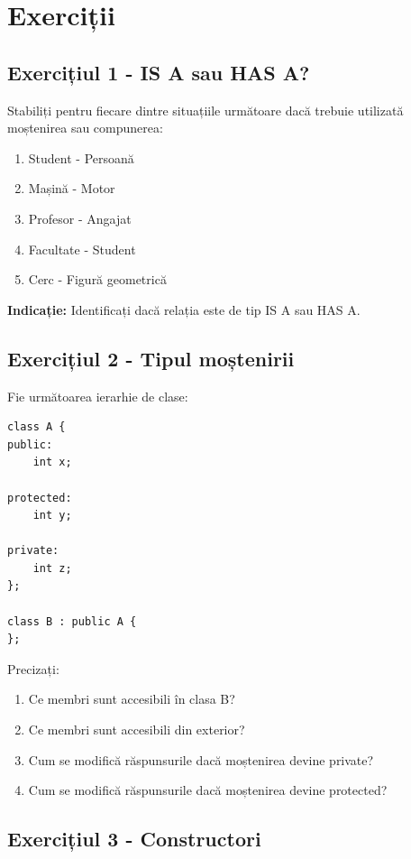 \documentclass[12pt,a4paper]{article}
\begin{document}
\section{Exerciții}

\subsection{Exercițiul 1 - IS A sau HAS A?}

Stabiliți pentru fiecare dintre situațiile următoare dacă trebuie utilizată moștenirea sau compunerea:

\begin{enumerate}
\item Student - Persoană
\item Mașină - Motor
\item Profesor - Angajat
\item Facultate - Student
\item Cerc - Figură geometrică
\end{enumerate}

\textbf{Indicație:} Identificați dacă relația este de tip IS A sau HAS A.

\subsection{Exercițiul 2 - Tipul moștenirii}

Fie următoarea ierarhie de clase:

\begin{verbatim}
class A {
public:
    int x;

protected:
    int y;

private:
    int z;
};

class B : public A {
};
\end{verbatim}

Precizați:

\begin{enumerate}
\item Ce membri sunt accesibili în clasa B?
\item Ce membri sunt accesibili din exterior?
\item Cum se modifică răspunsurile dacă moștenirea devine private?
\item Cum se modifică răspunsurile dacă moștenirea devine protected?
\end{enumerate}

\subsection{Exercițiul 3 - Constructori}
\end{document}
